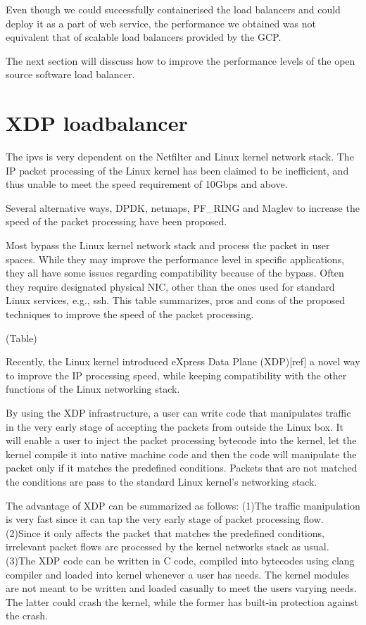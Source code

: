 Even though we could successfully containerised the load balancers and could deploy it as a part of web service, the performance we obtained was not equivalent that of scalable load balancers provided by the GCP.

The next section will disscuss how to improve the performance levels of the open source software load balancer. 

\section{XDP loadbalancer}\label{XDP loadbalancer}

The ipvs is very dependent on the Netfilter and Linux kernel network stack.
The IP packet processing of the Linux kernel has been claimed to be inefficient, and thus unable to meet the speed requirement of 10Gbps and above.

Several alternative ways, DPDK, netmaps, PF\_RING and Maglev to increase the speed of the packet processing have been proposed.

Most bypass the Linux kernel network stack and process the packet in user spaces.
While they may improve the performance level in specific applications, they all have some issues regarding compatibility because of the bypass.
Often they require designated physical NIC, other than the ones used for standard Linux services, e.g., ssh.
This table summarizes, pros and cons of the proposed techniques to improve the speed of the packet processing.

(Table)

Recently, the Linux kernel introduced eXpress Data Plane (XDP)[ref] a novel way to improve the IP processing speed, while keeping compatibility with the other functions of the Linux networking stack.

By using the XDP infrastructure, a user can write code that manipulates traffic in the very early stage of accepting the packets from outside the Linux box.
It will enable a user to inject the packet processing bytecode into the kernel, let the kernel compile it into native machine code and then the code will manipulate the packet only if it matches the predefined conditions.
Packets that are not matched the conditions are pass to the standard Linux kernel's networking stack.

The advantage of XDP can be summarized as follows:
(1)The traffic manipulation is very fast since it can tap the very early stage of packet processing flow.
(2)Since it only affects the packet that matches the predefined conditions, irrelevant packet flows are processed by the kernel networks stack as usual.
(3)The XDP code can be written in C code, compiled into bytecodes using clang compiler and loaded into kernel whenever a user has needs. The kernel modules are not meant to be written and loaded casually to meet the users varying needs. The latter could crash the kernel, while the former has built-in protection against the crash.

